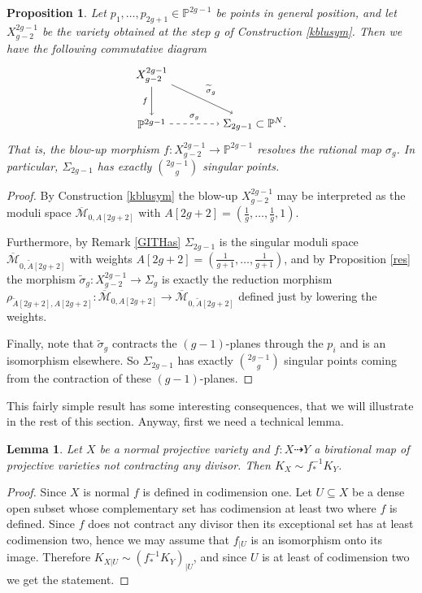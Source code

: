 \documentclass[a4paper,10pt]{amsart}
\newtheorem{Lemma}[thm]{Lemma}
\newtheorem{Proposition}[thm]{Proposition}
\theoremstyle{definition}
\newcommand{\cM}{\overline{\mathcal{M}}}
\begin{document}
\begin{Proposition}\label{resseg}
Let $p_1,\dots,p_{2g+1}\in\mathbb{P}^{2g-1}$ be points in general position, and let $X^{2g-1}_{g-2}$ be the variety obtained at the step $g$ of Construction \ref{kblusym}. Then we have the following commutative diagram 
\[
  \begin{tikzpicture}[xscale=3.2,yscale=-1.5]
    \node (A0_0) at (0, 0) {$X^{2g-1}_{g-2}$};
    \node (A1_0) at (0, 1) {$\mathbb{P}^{2g-1}$};
    \node (A1_1) at (1, 1) {$\Sigma_{2g-1}\subset\mathbb{P}^N.$};
    \path (A0_0) edge [->,swap]node [auto] {$\scriptstyle{f}$} (A1_0);
    \path (A1_0) edge [->,dashed]node [auto] {$\scriptstyle{\sigma_g}$} (A1_1);
    \path (A0_0) edge [->]node [auto] {$\scriptstyle{\widetilde{\sigma}_g}$} (A1_1);
  \end{tikzpicture}
  \]
That is, the blow-up morphism $f:X^{2g-1}_{g-2}\rightarrow\mathbb{P}^{2g-1}$ resolves the rational map $\sigma_g$. In particular, $\Sigma_{2g-1}$ has exactly $\binom{2g-1}{g}$ singular points. 
\end{Proposition}
\begin{proof}
By Construction \ref{kblusym} the blow-up $X^{2g-1}_{g-2}$ may be interpreted as the moduli space $\cM_{0,A[2g+2]}$ with $A[2g+2] = \left(\frac{1}{g},\dots,\frac{1}{g},1\right)$. 

Furthermore, by Remark \ref{GITHas} $\Sigma_{2g-1}$ is the singular moduli space $\cM_{0,\widetilde{A}[2g+2]}$ with weights $A[2g+2] = \left(\frac{1}{g+1},\dots,\frac{1}{g+1}\right)$, and by Proposition \ref{res} the morphism $\widetilde{\sigma}_g:X^{2g-1}_{g-2}\rightarrow \Sigma_g$ is exactly the reduction morphism $\rho_{\widetilde{A}[2g+2],A[2g+2]}:\cM_{0,A[2g+2]}\rightarrow \cM_{0,\widetilde{A}[2g+2]}$ defined just by lowering the weights. 

Finally, note that $\widetilde{\sigma}_g$ contracts the $(g-1)$-planes through the $p_i$ and is an isomorphism elsewhere. So $\Sigma_{2g-1}$ has exactly $\binom{2g-1}{g}$ singular points coming from the contraction of these $(g-1)$-planes.  
\end{proof}

This fairly simple result has some interesting consequences, that we will illustrate in the rest of this section. Anyway, first we need a technical lemma.

\begin{Lemma}\label{teclemma}
Let $X$ be a normal projective variety and $f:X\dasharrow Y$ a birational map of projective varieties not contracting any divisor. Then $K_X \sim f^{-1}_{*}K_Y$.
\end{Lemma}
\begin{proof}
Since $X$ is normal $f$ is defined in codimension one. Let $U\subseteq X$ be a dense open subset whose complementary set has codimension at least two where $f$ is defined. Since $f$ does not contract any divisor then its exceptional set has at least codimension two, hence we may assume that $f_{|U}$ is an isomorphism onto its image. Therefore $K_{X|U} \sim (f^{-1}_{*}K_Y)_{|U}$, and since $U$ is at least of codimension two we get the statement. 
\end{proof}
\end{document}
